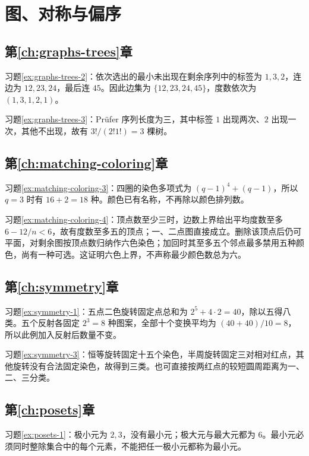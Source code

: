 \documentclass[UTF8,12pt,a4paper,fontset=fandol]{ctexbook}
\begin{document}
\section{图、对称与偏序}

\subsection{第\ref{ch:graphs-trees}章}

习题\ref{ex:graphs-trees-2}：依次选出的最小未出现在剩余序列中的标签为 $1,3,2$，连边为 $12,23,24$，最后连 $45$。因此边集为 $\{12,23,24,45\}$，度数依次为 $(1,3,1,2,1)$。

习题\ref{ex:graphs-trees-3}：Pr\"ufer 序列长度为三，其中标签 $1$ 出现两次、$2$ 出现一次，其他不出现，故有 $3!/(2!1!)=3$ 棵树。

\subsection{第\ref{ch:matching-coloring}章}

习题\ref{ex:matching-coloring-3}：四圈的染色多项式为 $(q-1)^4+(q-1)$，所以 $q=3$ 时有 $16+2=18$ 种。颜色已有名称，不再除以颜色排列数。

习题\ref{ex:matching-coloring-4}：顶点数至少三时，边数上界给出平均度数至多 $6-12/n<6$，故有度数至多五的顶点；一、二点图直接成立。删除该顶点后仍可平面，对剩余图按顶点数归纳作六色染色；加回时其至多五个邻点最多禁用五种颜色，尚有一种可选。这证明六色上界，不声称最少颜色数总为六。

\subsection{第\ref{ch:symmetry}章}

习题\ref{ex:symmetry-1}：五点二色旋转固定点总和为 $2^5+4\cdot2=40$，除以五得八类。五个反射各固定 $2^3=8$ 种图案，全部十个变换平均为 $(40+40)/10=8$，所以此例加入反射后数量不变。

习题\ref{ex:symmetry-3}：恒等旋转固定十五个染色，半周旋转固定三对相对红点，其他旋转没有合法固定染色，故得到三类。也可直接按两红点的较短圆周距离为一、二、三分类。

\subsection{第\ref{ch:posets}章}

习题\ref{ex:posets-1}：极小元为 $2,3$，没有最小元；极大元与最大元都为 $6$。最小元必须同时整除集合中的每个元素，不能把任一极小元都称为最小元。
\end{document}
